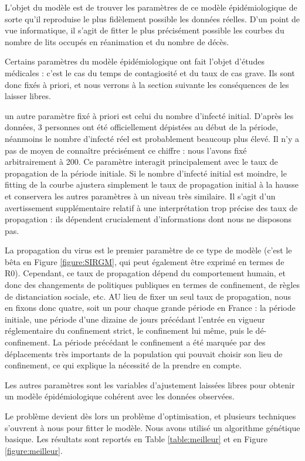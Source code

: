 \documentclass[review]{elsarticle}
\begin{document}
L'objet du modèle est de trouver les paramètres de ce modèle épidémiologique de sorte qu'il reproduise le plus fidèlement possible les données réelles. D'un point de vue informatique, il s'agit de fitter le plus précisément possible les courbes du nombre de lits occupés en réanimation et du nombre de décès. 

Certains paramètres du modèle épidémiologique ont fait l'objet d'études médicales : c'est le cas du temps de contagiosité et du taux de cas grave. Ils sont donc fixés à priori, et nous verrons à la section suivante les conséquences de les laisser libres.

un autre paramètre fixé à priori est celui du nombre d'infecté initial. D'après les données, 3 personnes ont été officiellement dépistées au début de la période, néanmoins le nombre d'infecté réel est probablement beaucoup plus élevé. Il n'y a pas de moyen de connaître précisément ce chiffre : nous l'avons fixé arbitrairement à 200. Ce paramètre interagit principalement avec le taux de propagation de la période initiale. Si le nombre d'infecté initial est moindre, le fitting de la courbe ajustera simplement le taux de propagation initial à la hausse et conservera les autres paramètres à un niveau très similaire. Il s'agit d'un avertissement supplémentaire relatif à une interprétation trop précise des taux de propagation : ils dépendent crucialement d'informations dont nous ne disposons pas.

La propagation du virus est le premier paramètre de ce type de modèle (c'est le bêta en Figure \ref{figure:SIRGM}, qui peut également être exprimé en termes de R0). Cependant, ce taux de propagation dépend du comportement humain, et donc des changements de politiques publiques en termes de confinement, de règles de distanciation sociale, etc. AU lieu de fixer un seul taux de propagation, nous en fixons donc quatre, soit un pour chaque grande période en France : la période initiale, une période d'une dizaine de jours précédant l'entrée en vigueur réglementaire du confinement strict, le confinement lui même, puis le dé-confinement. La période précédant le confinement a été marquée par des déplacements très importants de la population qui pouvait choisir son lieu de confinement, ce qui explique la nécessité de la prendre en compte.

Les autres paramètres sont les variables d'ajustement laissées libres pour obtenir un modèle épidémiologique cohérent avec les données observées.

Le problème devient dès lors un problème d'optimisation, et plusieurs techniques s'ouvrent à nous pour fitter le modèle. Nous avons utilisé un algorithme génétique basique. Les résultats sont reportés en Table \ref{table:meilleur} et en Figure \ref{figure:meilleur}.
\end{document}
